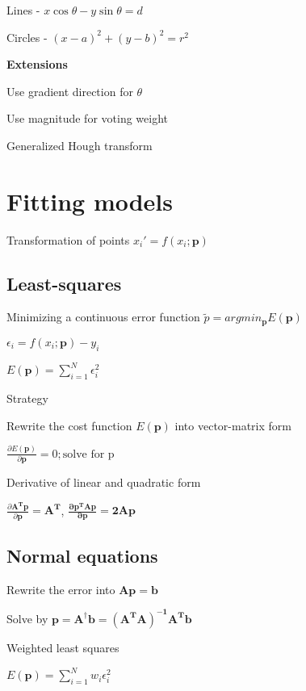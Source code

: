 \documentclass{article}
\begin{document}
\begin{multicols*}{2}
{	Lines - $x \cos \theta - y \sin \theta = d$

	Circles - $(x - a)^2 + (y - b)^2 = r^2$

	\textbf{Extensions}
	\begin{compactitem}
		\item Use gradient direction for $\theta$
		\item Use magnitude for voting weight
		\item Generalized Hough transform
	\end{compactitem}

	\section{Fitting models}

	Transformation of points $x_i' = f(x_i; \mathbf{p})$

	\subsection{Least-squares}
	Minimizing a continuous error function $\tilde{p} = argmin_\mathbf{p}E(\mathbf{p})$

	$\epsilon_i = f(x_i; \mathbf{p}) - y_i$

	$E(\mathbf{p}) = \sum_{i=1}^{N}\epsilon_i^2$

	Strategy

	\begin{compactenum}
		\item Rewrite the cost function $E(\mathbf{p})$ into vector-matrix form
		\item $\frac{\partial E(\mathbf{p})}{\partial \mathbf{p}} = 0; \text{solve for p}$
	\end{compactenum}

	Derivative of linear and quadratic form

	$\frac{\partial \mathbf{A^Tp}}{\partial \mathbf{p}} = \mathbf{A^T}$,
	$\mathbf{\frac{\partial p^T A p}{\partial p} = 2 A p}$


	\subsection{Normal equations}

	Rewrite the error into $\mathbf{A p = b}$

	Solve by $\mathbf{p = A^\dagger b = (A^TA)^{-1}A^Tb}$

	Weighted least squares

	$E(\mathbf{p}) = \sum_{i=1}^{N}w_i\epsilon_i^2$

}
\end{multicols*}
\end{document}
